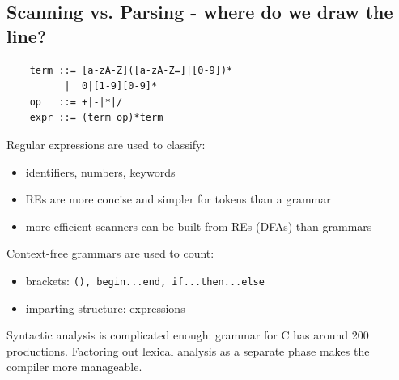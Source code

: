 \documentclass[10pt]{article}
\begin{document}
\subsection*{Scanning vs. Parsing - where do we draw the line?}
\begin{verbatim}
    term ::= [a-zA-Z]([a-zA-Z=]|[0-9])*
          |  0|[1-9][0-9]*
    op   ::= +|-|*|/
    expr ::= (term op)*term
\end{verbatim}  
Regular expressions are used to classify:
\begin{itemize}
    \item identifiers, numbers, keywords
    \item REs are more concise and simpler for tokens than a grammar
    \item more efficient scanners can be built from REs (DFAs) than grammars
\end{itemize}
Context-free grammars are used to count:
\begin{itemize}
    \item brackets: \texttt{(), begin...end, if...then...else}
    \item imparting structure: expressions
\end{itemize}
Syntactic analysis is complicated enough: grammar for C has around 200 productions.  Factoring out lexical analysis as a separate phase makes the compiler more manageable.
\end{document}
